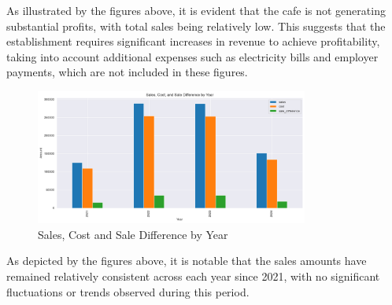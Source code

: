 As illustrated by the figures above, it is evident that the cafe is not generating substantial profits, with total sales being relatively low. This suggests that the establishment requires significant increases in revenue to achieve profitability, taking into account additional expenses such as electricity bills and employer payments, which are not included in these figures.

\begin{figure}[H]
	\centering
	\includegraphics[width=0.8\textwidth]{assets/deep/Sales, Cost and Sale Difference by Year}
	\caption{Sales, Cost and Sale Difference by Year}
	\label{fig:sales_cost_and_sale_difference_by_year}
\end{figure}

As depicted by the figures above, it is notable that the sales amounts have remained relatively consistent across each year since 2021, with no significant fluctuations or trends observed during this period.

